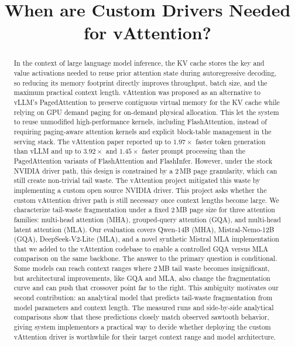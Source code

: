 \documentclass[conference]{IEEEtran}
\title{When are Custom Drivers Needed for vAttention?}
\author{\IEEEauthorblockN{Team 3}
\IEEEauthorblockA{Joshua Frank, Londy Jean, Beethoven Marhone, Kyle Merritt}}
\begin{document}
\maketitle

\begin{abstract}
In the context of large language model inference, the 
KV cache stores the key and value activations needed to reuse 
prior attention state during autoregressive decoding, so 
reducing its memory footprint directly improves throughput, 
batch size, and the maximum practical context length. 
vAttention was proposed as an alternative to vLLM's PagedAttention to 
preserve contiguous virtual memory for the KV cache while 
relying on GPU demand paging for on-demand physical allocation. 
This let the system to reuse unmodified high-performance kernels, 
including FlashAttention, instead of requiring paging-aware 
attention kernels and explicit block-table management in the 
serving stack. The vAttention paper reported up to $1.97\times$ 
faster token generation than vLLM and up to $3.92\times$ and 
$1.45\times$ faster prompt processing than the PagedAttention 
variants of FlashAttention and FlashInfer. However, under 
the stock NVIDIA driver path, this design is constrained 
by a 2\,MB page granularity, which can still create non-trivial 
tail waste. The vAttention project mitigated this waste by implementing 
a custom open source NVIDIA driver.
This project asks whether the custom vAttention driver path 
is still necessary once context lengths become large. 
We characterize tail-waste fragmentation under a fixed 2\,MB 
page size for three attention families: multi-head attention (MHA), 
grouped-query attention (GQA), and multi-head latent attention (MLA). 
Our evaluation covers Qwen-14B (MHA), Mistral-Nemo-12B (GQA), 
DeepSeek-V2-Lite (MLA), and a novel synthetic Mistral MLA 
implementation that we added to the vAttention codebase 
to enable a controlled GQA versus MLA comparison on the same backbone. 
The answer to the primary question is conditional. 
Some models can reach context ranges where 2\,MB tail 
waste becomes insignificant, but architectural improvements, like GQA and MLA,
also change the fragmentation curve and can push that crossover 
point far to the right. This ambiguity motivates our second 
contribution: an analytical model that predicts tail-waste fragmentation 
from model parameters and context length. The measured runs and 
side-by-side analytical comparisons show that these predictions 
closely match observed sawtooth behavior, giving system implementors a 
practical way to decide whether deploying the custom vAttention 
driver is worthwhile for their target context range and model architecture.
\end{abstract}
\end{document}
